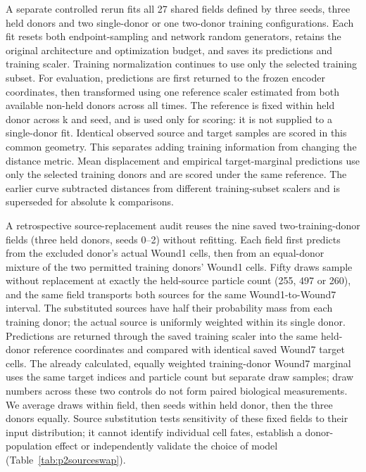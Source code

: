 A separate controlled rerun fits all 27 shared fields defined by three seeds, three held donors and two single-donor or one two-donor training configurations. Each fit resets both endpoint-sampling and network random generators, retains the original architecture and optimization budget, and saves its predictions and training scaler. Training normalization continues to use only the selected training subset. For evaluation, predictions are first returned to the frozen encoder coordinates, then transformed using one reference scaler estimated from both available non-held donors across all times. The reference is fixed within held donor across k and seed, and is used only for scoring: it is not supplied to a single-donor fit. Identical observed source and target samples are scored in this common geometry. This separates adding training information from changing the distance metric. Mean displacement and empirical target-marginal predictions use only the selected training donors and are scored under the same reference. The earlier curve subtracted distances from different training-subset scalers and is superseded for absolute k comparisons.

A retrospective source-replacement audit reuses the nine saved two-training-donor fields (three held donors, seeds 0--2) without refitting. Each field first predicts from the excluded donor's actual Wound1 cells, then from an equal-donor mixture of the two permitted training donors' Wound1 cells. Fifty draws sample without replacement at exactly the held-source particle count (255, 497 or 260), and the same field transports both sources for the same Wound1-to-Wound7 interval. The substituted sources have half their probability mass from each training donor; the actual source is uniformly weighted within its single donor. Predictions are returned through the saved training scaler into the same held-donor reference coordinates and compared with identical saved Wound7 target cells. The already calculated, equally weighted training-donor Wound7 marginal uses the same target indices and particle count but separate draw samples; draw numbers across these two controls do not form paired biological measurements. We average draws within field, then seeds within held donor, then the three donors equally. Source substitution tests sensitivity of these fixed fields to their input distribution; it cannot identify individual cell fates, establish a donor-population effect or independently validate the choice of model (Table~\ref{tab:p2sourceswap}).

